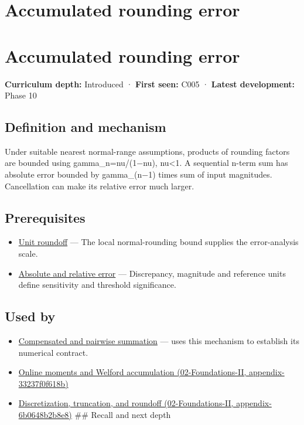 \hypertarget{appendix-f82e270791c8}{}
\section*{Accumulated rounding error}
\section{Accumulated rounding error}\label{accumulated-rounding-error}

\textbf{Curriculum depth:} Introduced · \textbf{First seen:} C005 · \textbf{Latest development:} Phase 10

\subsection{Definition and mechanism}\label{definition-and-mechanism}

Under suitable nearest normal-range assumptions, products of rounding factors are bounded using gamma\_n=nu/(1−nu), nu\textless1. A sequential n-term sum has absolute error bounded by gamma\_(n−1) times sum of input magnitudes. Cancellation can make its relative error much larger.

\subsection{Prerequisites}\label{prerequisites}

\begin{itemize}
\tightlist
\item
  \hyperref[appendix-bc44f7b42f42]{Unit roundoff} --- The local normal-rounding bound supplies the error-analysis scale.
\item
  \hyperref[appendix-3ae74e89b4e6]{Absolute and relative error} --- Discrepancy, magnitude and reference units define sensitivity and threshold significance.
\end{itemize}

\subsection{Used by}\label{used-by}

\begin{itemize}
\item
  \hyperref[appendix-df318da57389]{Compensated and pairwise summation} --- uses this mechanism to establish its numerical contract.
\item
  \href{}{Online moments and Welford accumulation (02-Foundations-II, appendix-33237f0f618b)}
\item
  \href{}{Discretization, truncation, and roundoff (02-Foundations-II, appendix-6b0648b2b8e8)} \#\# Recall and next depth
\end{itemize}

